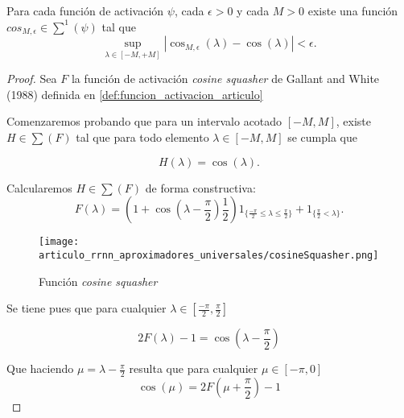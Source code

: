 \begin{lema}\label{lema:A_3_función_activación_continua_con_arbitaria}
    Para cada función de activación $\psi$, cada $\epsilon >0$
    y cada $M>0$ existe una función 
    $cos_{M,\epsilon} \in \sum^1(\psi)$ tal que 
    \begin{equation}
        \sup_{ \lambda \in [-M, +M]}
        |\cos_{M,\epsilon}(\lambda) - \cos(\lambda)|
        < 
        \epsilon. 
    \end{equation}
\end{lema}
\begin{proof}
    Sea $F$ la función de activación \textit{cosine squasher} de Gallant and White (1988) definida 
    en \ref{def:funcion_activacion_articulo}

    Comenzaremos probando que para un intervalo acotado $[-M, M]$, existe $H \in \sum(F)$ 
    tal que para todo elemento $\lambda \in [-M, M]$ se cumpla que 

    \begin{equation}
        H(\lambda) = \cos(\lambda).
    \end{equation}

    Calcularemos $H \in \sum(F)$  de forma constructiva: 
    \begin{equation}
        F(\lambda )= \left(1 + \cos\left(\lambda -\frac{\pi}{2} \right) \frac{1}{2}\right) 
         1_{\{\frac{-\pi}{2} \leq \lambda \leq  \frac{\pi}{2}\}}
         +
         1_{\{ \frac{\pi}{2} < \lambda \}}.
    \end{equation}
    
    \begin{figure}[h]
        \centering
        \texttt{[image: articulo\_rrnn\_aproximadores\_universales/cosineSquasher.png]}
        \caption{Función \textit{cosine squasher}}
        \label{fig:cosine_squaser}
    \end{figure}

    Se tiene pues que para cualquier $\lambda \in \left[ \frac{-\pi}{2}, \frac{\pi}{2}\right]$

    \begin{equation}
        2 F(\lambda)-1 = \cos \left( \lambda - \frac{\pi}{2}\right)
    \end{equation}

    Que haciendo $\mu = \lambda - \frac{\pi}{2}$ resulta que para cualquier
    $\mu \in [-\pi, 0]$
    \begin{equation}
        \cos(\mu) = 2 F \left(\mu + \frac{\pi}{2} \right)  -1 
    \end{equation}


\end{proof}
